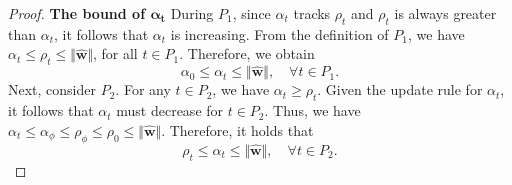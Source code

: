 \documentclass[10pt,a4paper]{amsart}
\begin{document}
\begin{proof}
  \noindent \textbf{The bound of \( \boldsymbol{\alpha_t} \)} 
  During \( P_1 \), since \( \alpha_t \) tracks \( \rho_t \) and \( \rho_t \) is always greater than \( \alpha_t \), it follows that \( \alpha_t \) is increasing. 
  From the definition of \( P_1 \), we have \( \alpha_t \le \rho_t \le \Vert \hat{\mathbf{w}} \Vert \), for all \( t \in P_1 \). Therefore, we obtain 
  \begin{equation*}
  \alpha_0 \le \alpha_t \le \Vert \hat{\mathbf{w}} \Vert, \quad \forall t \in P_1.
  \end{equation*}
  Next, consider \( P_2 \). For any \( t \in P_2 \), we have \( \alpha_t \ge \rho_t \). 
  Given the update rule for \( \alpha_t \), it follows that \( \alpha_t \) must decrease for \( t \in P_2 \). 
  Thus, we have 
  $\alpha_t \le \alpha_{\phi} \le \rho_{\phi} \le \rho_0 \le \Vert \hat{\mathbf{w}} \Vert.$
  Therefore, it holds that 
  \begin{equation*}
  \rho_t \le \alpha_t \le \Vert \hat{\mathbf{w}} \Vert, \quad \forall t \in P_2.
  \end{equation*}


\end{proof}
\end{document}
